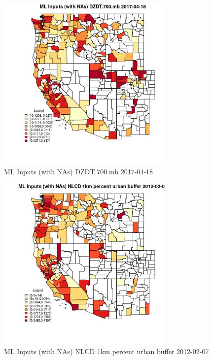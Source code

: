 \begin{figure} 
\centering  
\includegraphics[width=0.77\textwidth]{Code_Outputs/Report_ML_input_PM25_Step4_part_f_de_duplicated_aves_prioritize_24hr_obswNAs_CountyDZDT700mbMean2017-04-18.jpg} 
\caption{\label{fig:Report_ML_input_PM25_Step4_part_f_de_duplicated_aves_prioritize_24hr_obswNAsCountyDZDT700mbMean2017-04-18}ML Inputs (with NAs) DZDT.700.mb 2017-04-18} 
\end{figure} 
 

\clearpage 

\begin{figure} 
\centering  
\includegraphics[width=0.77\textwidth]{Code_Outputs/Report_ML_input_PM25_Step4_part_f_de_duplicated_aves_prioritize_24hr_obswNAs_CountyNLCD_1km_percent_urban_bufferMean2012-02-07.jpg} 
\caption{\label{fig:Report_ML_input_PM25_Step4_part_f_de_duplicated_aves_prioritize_24hr_obswNAsCountyNLCD_1km_percent_urban_bufferMean2012-02-07}ML Inputs (with NAs) NLCD 1km percent urban buffer 2012-02-07} 
\end{figure} 
 

